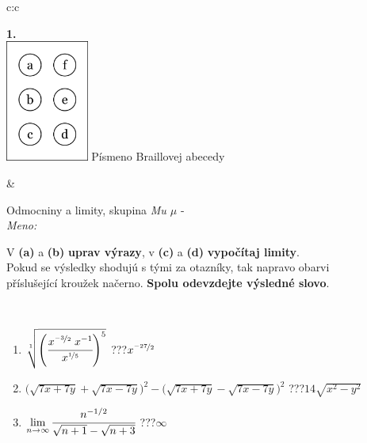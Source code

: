 \documentclass[10pt]{report}
\begin{document}
\begin{tabular}{c:c}
\begin{minipage}[c][104.5mm][t]{0.5\linewidth}
\begin{center}
\begin{minipage}{0.20\linewidth}
\begin{center}
{\Huge\bfseries 1.} \\[2mm]
\includegraphics[height=40mm]{../images/braille.png}
{\small Písmeno Braillovej abecedy}
\end{center}
\end{minipage}
\end{center}
\end{minipage}
&
\begin{minipage}[c][104.5mm][t]{0.5\linewidth}
\begin{center}
\vspace{7mm}
{\huge Odmocniny a limity, skupina \textit{Mu $\mu$} -}\\[5mm]
\textit{Meno:}\phantom{xxxxxxxxxxxxxxxxxxxxxxxxxxxxxxxxxxxxxxxxxxxxxxxxxxxxxxxxxxxxxxxxx}\\[5mm]
\begin{minipage}{0.95\linewidth}
\begin{center}
V \textbf{(a)} a \textbf{(b)} \textbf{uprav výrazy}, v \textbf{(c)} a \textbf{(d)} \textbf{vypočítaj limity}.\\Pokud se výsledky shodujú s tými za otazníky, tak napravo obarvi\\příslušející kroužek načerno. \textbf{Spolu odevzdejte výsledné slovo}.
\end{center}
\end{minipage}
\\[1mm]
\begin{minipage}{0.79\linewidth}
\begin{center}
\begin{varwidth}{\linewidth}
\begin{enumerate}
\small
\item $\sqrt[1]{\left(\cfrac{x^{\nicefrac{-3}{2}}\;x^{-1}}{x^{\nicefrac{1}{5}}}\right)^{5}}$\quad \dotfill\; ???\;\dotfill \quad $x^{\nicefrac{-27}{2}}$
\item {\footnotesize{\scriptsize$\big(\sqrt{7x+7y}+\sqrt{7x-7y}\big)^2-\big(\sqrt{7x+7y}-\sqrt{7x-7y}\big)^2$}\quad \dotfill\; ???\;\dotfill \quad $14\sqrt{x^2-y^2}$}
\item $\lim\limits_{n\to\infty}\cfrac{n^{-1/2}}{\sqrt{n+1}-\sqrt{n+3}}$\quad \dotfill\; ???\;\dotfill \quad $\infty$

\end{enumerate}
\end{varwidth}
\end{center}
\end{minipage}
\end{center}
\end{minipage}
\end{tabular}
\end{document}
